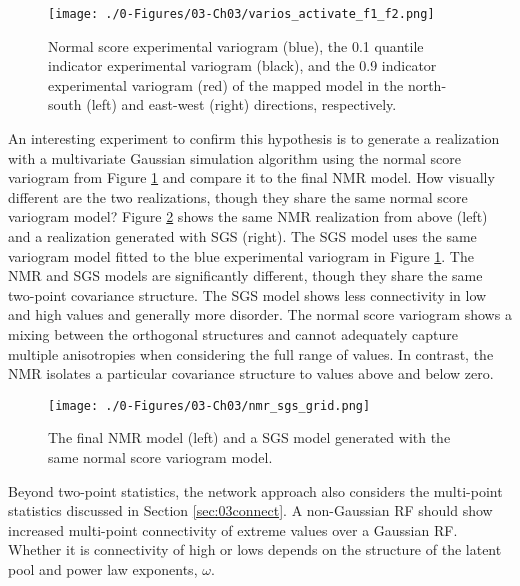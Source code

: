 \begin{figure}[htb!]
    \centering
    \texttt{[image: ./0-Figures/03-Ch03/varios\_activate\_f1\_f2.png]}
    \caption{Normal score experimental variogram (blue), the 0.1 quantile indicator experimental variogram (black), and the 0.9 indicator experimental variogram (red) of the mapped model in the north-south (left) and east-west (right) directions, respectively.}
    \label{fig:varios_activate_f1_f2}
\end{figure}

An interesting experiment to confirm this hypothesis is to generate a realization with a multivariate Gaussian simulation algorithm using the normal score variogram from Figure \ref{fig:varios_activate_f1_f2} and compare it to the final \gls{NMR} model. How visually different are the two realizations, though they share the same normal score variogram model? Figure \ref{fig:nmr_sgs_grid} shows the same \gls{NMR} realization from above (left) and a realization generated with \gls{SGS} (right). The \gls{SGS} model uses the same variogram model fitted to the blue experimental variogram in Figure \ref{fig:varios_activate_f1_f2}. The \gls{NMR} and \gls{SGS} models are significantly different, though they share the same two-point covariance structure. The \gls{SGS} model shows less connectivity in low and high values and generally more disorder. The normal score variogram shows a mixing between the orthogonal structures and cannot adequately capture multiple anisotropies when considering the full range of values. In contrast, the \gls{NMR} isolates a particular covariance structure to values above and below zero.

\begin{figure}[htb!]
    \centering
    \texttt{[image: ./0-Figures/03-Ch03/nmr\_sgs\_grid.png]}
    \caption{ The final \gls{NMR} model (left) and a \gls{SGS} model generated with the same normal score variogram model. }
    \label{fig:nmr_sgs_grid}
\end{figure}

Beyond two-point statistics, the network approach also considers the multi-point statistics discussed in Section \ref{sec:03connect}. A non-Gaussian \gls{RF} should show increased multi-point connectivity of extreme values over a Gaussian \gls{RF}. Whether it is connectivity of high or lows depends on the structure of the latent pool and power law exponents, $\omega$.


\FloatBarrier
